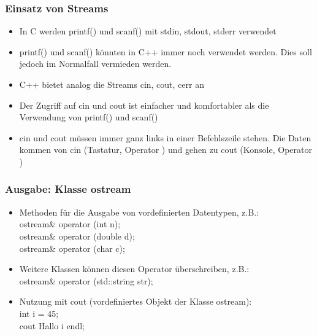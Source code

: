 \subsubsection{Einsatz von Streams\hfill}
\label{sec:unterunterabschnitt}
\begin{itemize}
	\item In C werden printf() und scanf() mit stdin, stdout, stderr verwendet
	\item printf() und scanf() könnten in C++ immer noch verwendet werden. Dies soll jedoch im Normalfall vermieden werden.
	\item C++ bietet analog die Streams cin, cout, cerr an
	\item Der Zugriff auf cin und cout ist einfacher und komfortabler als die Verwendung von printf() und scanf()
	\item cin und cout müssen immer ganz links in einer Befehlszeile stehen. Die Daten kommen von cin (Tastatur, Operator \frq\frq) und gehen zu cout (Konsole, Operator \flq\flq)
\end{itemize}

\subsubsection{Ausgabe: Klasse ostream\hfill}
\label{sec:unterunterabschnitt}
\begin{itemize}
	\item Methoden für die Ausgabe von vordefinierten Datentypen, z.B.:
		\\ ostream\& operator \flq\flq(int n);
		\\ ostream\& operator \flq\flq(double d);
		\\ ostream\& operator \flq\flq(char c);
	\item Weitere Klassen können diesen Operator überschreiben, z.B.:
		\\ ostream\& operator \flq\flq(std::string str);
	\item Nutzung mit cout (vordefiniertes Objekt der Klasse ostream):
		\\ int i = 45;
		\\cout \flq\flq \grqq Hallo  \grqq \flq\flq i \flq\flq endl;
\end{itemize}

